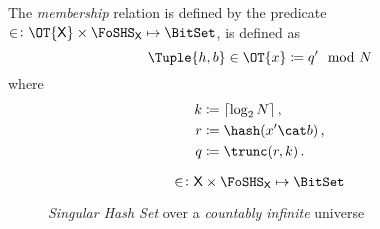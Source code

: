 \documentclass[ ../main.tex]{subfiles}
\begin{document}
The \emph{membership} relation is defined by the predicate $\SetContains \colon \OT{\Set{X}} \times \FoSHS_{\Set{X}} \mapsto \BitSet$, is defined as
\begin{equation}
    \Tuple{h,b} \SetContains \OT{x} \coloneqq q' \mod N
\end{equation}
where
\begin{equation}
    \begin{split}
        k &\coloneqq \lceil \log_2 N \rceil\,,\\
        r &\coloneqq \hash(x' \cat b)\,,\\
        q &\coloneqq \trunc(r,k)\,.
    \end{split}
\end{equation}



\begin{definition}
    \begin{equation}
        \SetContains \colon \Set{X} \times \FoSHS_{\Set{X}} \mapsto \BitSet
    \end{equation}
    
\end{definition}


\begin{figure}
    \centering
    
    \caption{\emph{Singular Hash Set} over a \emph{countably infinite} universe}
    \label{fig:my_label}
\end{figure}
\end{document}
